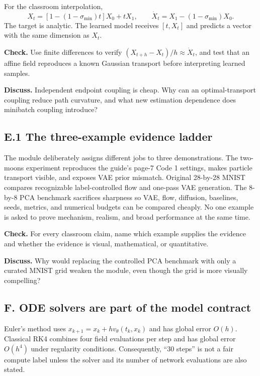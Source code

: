 \documentclass[11pt]{article}
\begin{document}
For the classroom interpolation,
\[
 X_t=[1-(1-\sigma_{\min})t]X_0+tX_1,
 \qquad
 \dot X_t=X_1-(1-\sigma_{\min})X_0.
\]
The target is analytic. The learned model receives $[t,X_t]$ and predicts a
vector with the same dimension as $X_t$.

\textbf{Check.} Use finite differences to verify
$(X_{t+h}-X_t)/h\approx\dot X_t$, and test that an affine field reproduces a
known Gaussian transport before interpreting learned samples.

\textbf{Discuss.} Independent endpoint coupling is cheap. Why can an
optimal-transport coupling reduce path curvature, and what new estimation
dependence does minibatch coupling introduce?

\subsection*{E.1 The three-example evidence ladder}

The module deliberately assigns different jobs to three demonstrations. The
two-moons experiment reproduces the guide's page-7 Code 1 settings, makes
particle transport visible, and exposes VAE prior mismatch. Original 28-by-28
MNIST compares recognizable label-controlled flow and one-pass VAE generation.
The 8-by-8 PCA benchmark sacrifices sharpness so VAE, flow, diffusion, baselines,
seeds, metrics, and numerical budgets can be compared cheaply.
No one example is asked to prove mechanism, realism, and broad performance at
the same time.

\textbf{Check.} For every classroom claim, name which example supplies the
evidence and whether the evidence is visual, mathematical, or quantitative.

\textbf{Discuss.} Why would replacing the controlled PCA benchmark with only a
curated MNIST grid weaken the module, even though the grid is more visually
compelling?

\subsection*{F. ODE solvers are part of the model contract}

Euler's method uses
$x_{k+1}=x_k+h v_\theta(t_k,x_k)$ and has global error $O(h)$. Classical RK4
combines four field evaluations per step and has global error $O(h^4)$ under
regularity conditions. Consequently, ``30 steps'' is not a fair compute label
unless the solver and its number of network evaluations are also stated.
\end{document}
